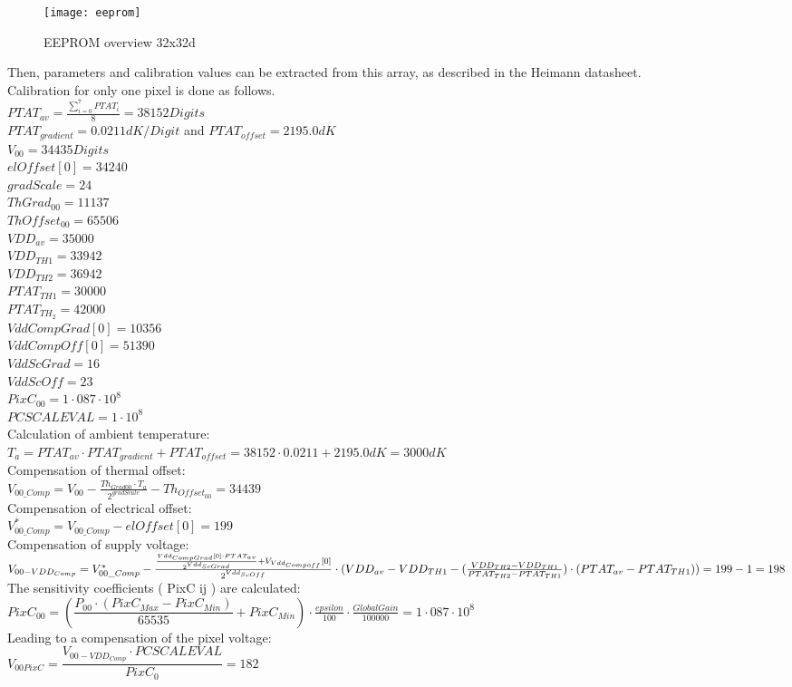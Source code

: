 \documentclass[thesis]{deutez}
\begin{document}
\begin{figure}[h!]
	\centering
	\texttt{[image: eeprom]}
	\caption{EEPROM overview 32x32d\cite{datasheet}}
\end{figure}
\FloatBarrier
Then, parameters and calibration values can be extracted from this array, as described in the Heimann datasheet.\cite{datasheet}\\
Calibration for only one pixel is done as follows.\\
$PTAT_{av} = \frac{\sum \limits _{i=0}^{7}{PTAT_i}}{8}=38152 Digits $ \\
$PTAT_{gradient}=0.0211 dK/Digit $ and $PTAT_{offset}=2195.0dK$ \\
$ V_{00}=34435 Digits $\\
$ elOffset[0]=34240 $\\
$gradScale=24  $\\
$ThGrad_{00}=11137$ \\
$ThOffset_{00}=65506 $\\
$VDD_{av}=35000 $\\
$ VDD_{TH1}= 33942 $\\
$ VDD_{TH2} = 36942 $\\
$ PTAT_{TH1} = 30000  $\\
$ PTAT_{TH_2} = 42000  $\\
$ VddCompGrad[ 0 ] = 10356 $\\
$ VddCompOff[ 0 ] =51390  $\\
$ VddScGrad = 16 $\\
$VddScOff = 23  $\\
$ PixC_{00}= 1\cdot087\cdot10^8 $\\
$ PCSCALEVAL = 1\cdot10^8 $\\
Calculation of ambient temperature:\\
$ 	T_a=PTAT_{av} \cdot PTAT_{gradient}+ PTAT_{offset}=38152 \cdot 0.0211 + 2195.0 dK =3000 dK $\\
Compensation of thermal offset:\\
$V_{00\_Comp}=V_{00}-\frac{Th_{Grad00} \cdot T_a}{2^{gradScale}}-Th_{Offset_{00}}=34439 $\\
Compensation of electrical offset:\\
$ 	V_{00\_Comp}^{\ast} =V_{00\_Comp}-elOffset[0]=199 $\\
Compensation of supply voltage:\\
$ V_{00-VDD_{Comp}}=V_{00\_Comp}^{\ast}-\frac{\frac{Vdd_{CompGrad}[0]\cdot PTAT_{av}}{2^{Vdd_{ScGrad}}}+V_{Vdd_{Compoff}}[0]}{2^{Vdd_{ScOff}}}\\
	\cdot(VDD_{av}-VDD_{TH1}-(\frac{VDD_{TH2}-VDD_{TH1}}{PTAT_{TH2}-PTAT_{TH1}})\cdot(PTAT_{av}-PTAT_{TH1}))=199-1=198 $
The sensitivity coefficients ( PixC ij ) are calculated:\\
$PixC_{00}=(\dfrac{P_{00} \cdot (PixC_{Max}-PixC_{Min})}{65535}+PixC_{Min}) \cdot \frac{epsilon}{100} \cdot \frac{GlobalGain}{100000}=1\cdot087\cdot10^8 $\\
Leading to a compensation of the pixel voltage:\\
$V_{00PixC}=\dfrac{	V_{00-VDD_{Comp}}\cdot PCSCALEVAL}{PixC_{0}}=182$\\ 
\end{document}
